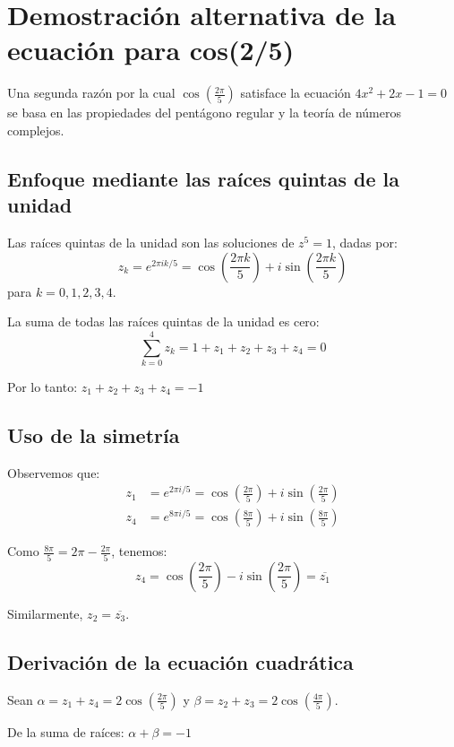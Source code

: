 \section{Demostración alternativa de la ecuación para cos(2\pi/5)}\label{sec:demostracion_alternativa}

Una segunda razón por la cual $\cos\left(\frac{2\pi}{5}\right)$ satisface la ecuación $4x^2 + 2x - 1 = 0$ se basa en las propiedades del pentágono regular y la teoría de números complejos.

\subsection{Enfoque mediante las raíces quintas de la unidad}

Las raíces quintas de la unidad son las soluciones de $z^5 = 1$, dadas por:
\[
z_k = e^{2\pi i k/5} = \cos\left(\frac{2\pi k}{5}\right) + i\sin\left(\frac{2\pi k}{5}\right)
\]
para $k = 0, 1, 2, 3, 4$.

La suma de todas las raíces quintas de la unidad es cero:
\[
\sum_{k=0}^{4} z_k = 1 + z_1 + z_2 + z_3 + z_4 = 0
\]

Por lo tanto: $z_1 + z_2 + z_3 + z_4 = -1$

\subsection{Uso de la simetría}

Observemos que:
\begin{align}
z_1 &= e^{2\pi i/5} = \cos\left(\frac{2\pi}{5}\right) + i\sin\left(\frac{2\pi}{5}\right) \\
z_4 &= e^{8\pi i/5} = \cos\left(\frac{8\pi}{5}\right) + i\sin\left(\frac{8\pi}{5}\right)
\end{align}

Como $\frac{8\pi}{5} = 2\pi - \frac{2\pi}{5}$, tenemos:
\[
z_4 = \cos\left(\frac{2\pi}{5}\right) - i\sin\left(\frac{2\pi}{5}\right) = \overline{z_1}
\]

Similarmente, $z_2 = \overline{z_3}$.

\subsection{Derivación de la ecuación cuadrática}

Sean $\alpha = z_1 + z_4 = 2\cos\left(\frac{2\pi}{5}\right)$ y $\beta = z_2 + z_3 = 2\cos\left(\frac{4\pi}{5}\right)$.

De la suma de raíces: $\alpha + \beta = -1$

